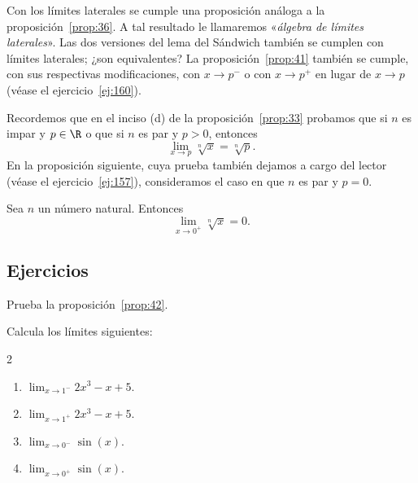 \documentclass[12pt,a4paper]{book}
\begin{document}
    \begin{observacion}\label{obs:12}
        Con los límites laterales se cumple una proposición análoga
        a la proposición~\ref{prop:36}. A tal resultado le llamaremos «\textit{álgebra de límites
        laterales}». Las dos versiones del lema del Sándwich también se cumplen con
        límites laterales; ¿son equivalentes? La proposición~\ref{prop:41} también se cumple,
        con sus respectivas modificaciones, con $x\to p^{-}$ o con $x\to p^{+}$ en lugar de
        $x\to p$ (véase el ejercicio~\ref{ej:160}).
    \end{observacion}

    Recordemos que en el inciso (d) de la proposición~\ref{prop:33} probamos que si $n$ es
    impar y $p\in\R$ o que si $n$ es par y $p>0$, entonces
    \begin{equation*}
        \lim_{x\to p}\sqrt[n]{x}=\sqrt[n]{p}.
    \end{equation*}
    En la proposición siguiente, cuya prueba también dejamos a cargo del lector
    (véase el ejercicio~\ref{ej:157}), consideramos el caso en que $n$ es par y $p=0$.

    \begin{proposicion}\label{prop:43}
        Sea $n$ un número natural. Entonces
        \begin{equation*}
            \lim_{x\to 0^{+}}\sqrt[n]{x}=0.
        \end{equation*}
    \end{proposicion}

    \par{}\subsection*{Ejercicios}

    \begin{ejercicio}\label{ej:153}
        Prueba la proposición~\ref{prop:42}.
    \end{ejercicio}

    \begin{ejercicio}\label{ej:154}
        Calcula los límites siguientes:
        \begin{multicols}{2}
        \begin{enumerate}[nosep]
            \item $\lim_{x\to 1^{-}}2x^{3}-x+5$.
            \item $\lim_{x\to 1^{+}}2x^{3}-x+5$.
            \item $\lim_{x\to 0^{-}}\sin(x)$.
            \item $\lim_{x\to 0^{+}}\sin(x)$.
        \end{enumerate}
        \end{multicols}
    \end{ejercicio}
\end{document}
